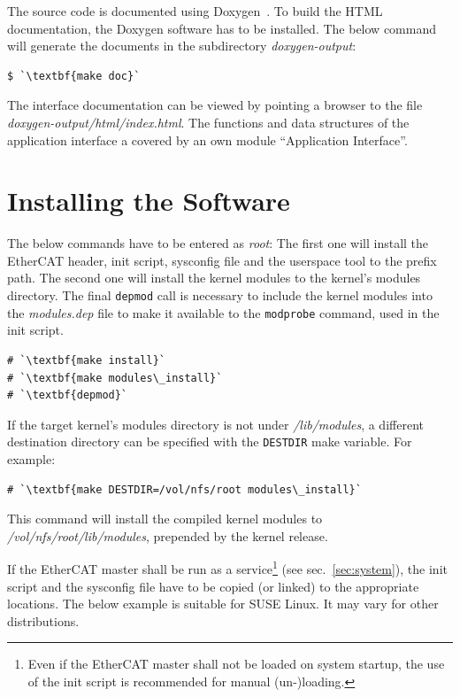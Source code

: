 \documentclass[a4paper,12pt,BCOR6mm,bibtotoc,idxtotoc]{scrbook}
\begin{document}
The source code is documented using Doxygen~\cite{doxygen}. To build the HTML
documentation, the Doxygen software has to be installed. The below command
will generate the documents in the subdirectory \textit{doxygen-output}:

\begin{lstlisting}
$ `\textbf{make doc}`
\end{lstlisting}

The interface documentation can be viewed by pointing a browser to the file
\textit{doxygen-output/html/index.html}. The functions and data structures of
the application interface a covered by an own module ``Application
Interface''.

\section{Installing the Software}

The below commands have to be entered as \textit{root}: The first one will
install the EtherCAT header, init script, sysconfig file and the userspace
tool to the prefix path. The second one will install the kernel modules to the
kernel's modules directory. The final \lstinline+depmod+ call is necessary to
include the kernel modules into the \textit{modules.dep} file to make it
available to the \lstinline+modprobe+ command, used in the init script. 

\begin{lstlisting}
# `\textbf{make install}`
# `\textbf{make modules\_install}`
# `\textbf{depmod}`
\end{lstlisting}

If the target kernel's modules directory is not under \textit{/lib/modules}, a
different destination directory can be specified with the \lstinline+DESTDIR+
make variable. For example:

\begin{lstlisting}
# `\textbf{make DESTDIR=/vol/nfs/root modules\_install}`
\end{lstlisting}

This command will install the compiled kernel modules to
\textit{/vol/nfs/root/lib/modules}, prepended by the kernel release.

If the EtherCAT master shall be run as a service\footnote{Even if the EtherCAT
master shall not be loaded on system startup, the use of the init script is
recommended for manual (un-)loading.} (see sec.~\ref{sec:system}), the init
script and the sysconfig file have to be copied (or linked) to the appropriate
locations. The below example is suitable for SUSE Linux. It may vary for other
distributions.
\end{document}
